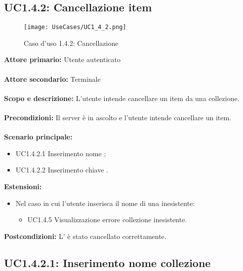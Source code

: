 \documentclass{scalatekids-article}
\begin{document}
\subsection{UC1.4.2: Cancellazione item}

\begin{figure}[H]
  \begin{center}
    \texttt{[image: UseCases/UC1\_4\_2.png]}
    \caption*{Caso d'uso 1.4.2: Cancellazione }
  \end{center}
\end{figure}
\textbf{Attore primario:} Utente autenticato\\ \\
\textbf{Attore secondario:} Terminale\\ \\
\textbf{Scopo e descrizione:} L'utente intende cancellare un item da una collezione.\\ \\
\textbf{Precondizioni:} Il server è in ascolto e l'utente intende cancellare un item.\\ \\
\textbf{Scenario principale:}
\begin{itemize}
  \item UC1.4.2.1 Inserimento nome ;
  \item UC1.4.2.2 Inserimento chiave .
\end{itemize}
\textbf{Estensioni:}
\begin{itemize}
  \item Nel caso in cui l'utente inserisca il nome di una  inesistente:
  \begin{itemize}
    \item UC1.4.5 Visualizzazione errore collezione inesistente.
  \end{itemize}
\end{itemize}
\textbf{Postcondizioni:} L' è stato cancellato correttamente.

\subsection{UC1.4.2.1: Inserimento nome collezione}
\end{document}
